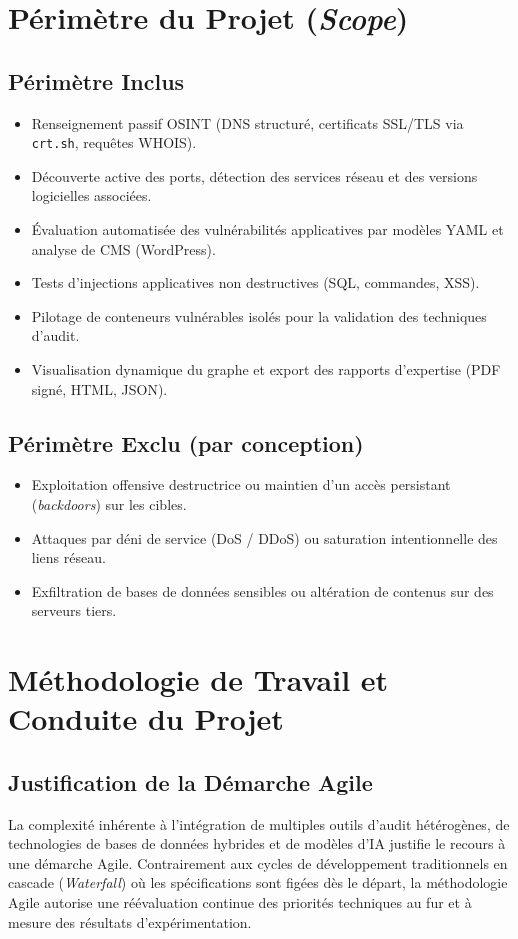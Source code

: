 \section{P\'erim\`etre du Projet (\textit{Scope})}
\subsection{P\'erim\`etre Inclus}
\begin{itemize}
    \item Renseignement passif OSINT (DNS structur\'e, certificats SSL/TLS via \texttt{crt.sh}, requ\^etes WHOIS).
    \item D\'ecouverte active des ports, d\'etection des services r\'eseau et des versions logicielles associ\'ees.
    \item \'Evaluation automatis\'ee des vuln\'erabilit\'es applicatives par mod\`eles YAML et analyse de CMS (WordPress).
    \item Tests d'injections applicatives non destructives (SQL, commandes, XSS).
    \item Pilotage de conteneurs vuln\'erables isol\'es pour la validation des techniques d'audit.
    \item Visualisation dynamique du graphe et export des rapports d'expertise (PDF sign\'e, HTML, JSON).
\end{itemize}

\subsection{P\'erim\`etre Exclu (par conception)}
\begin{itemize}
    \item Exploitation offensive destructrice ou maintien d'un acc\`es persistant (\textit{backdoors}) sur les cibles.
    \item Attaques par d\'eni de service (DoS / DDoS) ou saturation intentionnelle des liens r\'eseau.
    \item Exfiltration de bases de donn\'ees sensibles ou alt\'eration de contenus sur des serveurs tiers.
\end{itemize}

\section{M\'ethodologie de Travail et Conduite du Projet}
\subsection{Justification de la D\'emarche Agile}
\par La complexit\'e inh\'erente \`a l'int\'egration de multiples outils d'audit h\'et\'erog\`enes, de technologies de bases de donn\'ees hybrides et de mod\`eles d'IA justifie le recours \`a une d\'emarche Agile. Contrairement aux cycles de d\'eveloppement traditionnels en cascade (\textit{Waterfall}) o\`u les sp\'ecifications sont fig\'ees d\`es le d\'epart, la m\'ethodologie Agile autorise une r\'e\'evaluation continue des priorit\'es techniques au fur et \`a mesure des r\'esultats d'exp\'erimentation.

